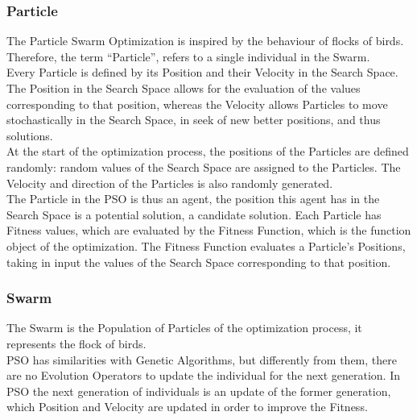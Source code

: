 \subsubsection{Particle}

The Particle Swarm Optimization is inspired by the behaviour of flocks of birds. Therefore, the term “Particle”, refers to a single individual in the Swarm.
\\[0.3cm]Every Particle is defined by its Position and their Velocity in the Search Space.
The Position in the Search Space allows for the evaluation of the values corresponding to that position, whereas the Velocity allows Particles to move stochastically in the Search Space, in seek of new better positions, and thus solutions.
% 
\\[0.3cm]At the start of the optimization process, the positions of the Particles are defined randomly: random values of the Search Space are assigned to the Particles.
The Velocity and direction of the Particles is also randomly generated.
% 
\\[0.3cm]The Particle in the PSO is thus an agent, the position this agent has in the Search Space is a potential solution, a candidate solution.
Each Particle has Fitness values, which are evaluated by the Fitness Function, which is the function object of the optimization.
The Fitness Function evaluates a Particle's Positions, taking in input the values of the Search Space corresponding to that position.

\subsubsection{Swarm}
The Swarm is the Population of Particles of the optimization process, it represents the flock of birds.
\\[0.3cm]PSO has similarities with Genetic Algorithms, but differently from them, there are no Evolution Operators to update the individual for the next generation.
In PSO the next generation of individuals is an update of the former generation, which Position and Velocity are updated in order to improve the Fitness.

